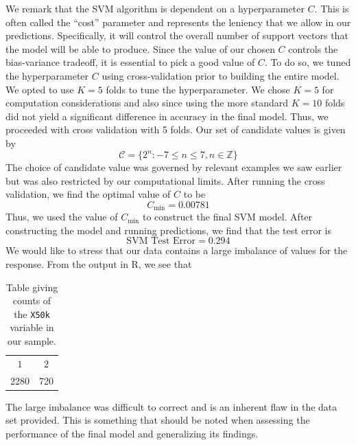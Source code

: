 \documentclass{article}
\begin{document}
    We remark that the SVM algorithm is dependent on a hyperparameter $C$. This is often called the ``cost'' parameter and represents the leniency that we allow in our predictions. Specifically, it will control the overall number of support vectors that the model will be able to produce. Since the value of our chosen $C$ controls the bias-variance tradeoff, it is essential to pick a good value of $C$. To do so, we tuned the hyperparameter $C$ using cross-validation prior to building the entire model. We opted to use $K = 5$ folds to tune the hyperparameter. We chose $K = 5$ for computation considerations and also since using the more standard $K = 10$ folds did not yield a significant difference in accuracy in the final model. Thus, we proceeded with cross validation with 5 folds. Our set of candidate values is given by 
    \begin{equation}
    		\mathcal{C} = \{2^n : -7 \leq n \leq 7, n\in \mathbb{Z}\}
    \end{equation}
    The choice of candidate value was governed by relevant examples we saw earlier but was also restricted by our computational limits. After running the cross validation, we find the optimal value of $C$ to be 
    \begin{equation}
    		C_{\text{min}} = 0.00781
    \end{equation}
    Thus, we used the value of $C_{\text{min}}$ to construct the final SVM model. After constructing the model and running predictions, we find that the test error is 
    \begin{equation}
    		\text{SVM Test Error} = 0.294
    \end{equation}
    We would like to stress that our data contains a large imbalance of values for the response. From the output in R, we see that 
    \begin{table}[H]
    		\centering
    		\begin{tabular}{cc}
    			\toprule 
    			$1$ & $2$ \\ 
    			2280 & 720 \\ 
    			\bottomrule
    		\end{tabular}
    		\caption{Table giving counts of the \texttt{X50k} variable in our sample.}
    		\label{tab:countsX50kSample}
    \end{table}
    The large imbalance was difficult to correct and is an inherent flaw in the data set provided. This is something that should be noted when assessing the performance of the final model and generalizing its findings. \par 
    
\end{document}
